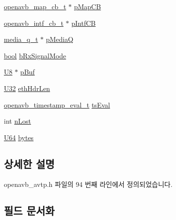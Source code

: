 \begin{DoxyCompactItemize}
\item 
\hyperlink{structopenavb__map__cb__t}{openavb\+\_\+map\+\_\+cb\+\_\+t} $\ast$ \hyperlink{structavtp__stream__t_ae26c54ab64456a99f94f3421e1d01960}{p\+Map\+CB}
\item 
\hyperlink{structopenavb__intf__cb__t}{openavb\+\_\+intf\+\_\+cb\+\_\+t} $\ast$ \hyperlink{structavtp__stream__t_a437f354862480a1e88dbf887decb189a}{p\+Intf\+CB}
\item 
\hyperlink{structmedia__q__t}{media\+\_\+q\+\_\+t} $\ast$ \hyperlink{structavtp__stream__t_a19b6a37a9e1222c5c08444ea175d6a45}{p\+MediaQ}
\item 
\hyperlink{avb__gptp_8h_af6a258d8f3ee5206d682d799316314b1}{bool} \hyperlink{structavtp__stream__t_aa3e26a0875dca06ce8a6040be346c595}{b\+Rx\+Signal\+Mode}
\item 
\hyperlink{openavb__types__base__pub_8h_aa63ef7b996d5487ce35a5a66601f3e73}{U8} $\ast$ \hyperlink{structavtp__stream__t_afedd920ccfd825275dcb5246a3c505d4}{p\+Buf}
\item 
\hyperlink{openavb__types__base__pub_8h_a696390429f2f3b644bde8d0322a24124}{U32} \hyperlink{structavtp__stream__t_accd5eff5dfccb78aa19869522125835b}{eth\+Hdr\+Len}
\item 
\hyperlink{openavb__timestamp_8h_ae4dadfad50e61c1a70e304edb29e6fcc}{openavb\+\_\+timestamp\+\_\+eval\+\_\+t} \hyperlink{structavtp__stream__t_ac4e4017bf67519fe0d817ab545496aad}{ts\+Eval}
\item 
int \hyperlink{structavtp__stream__t_a8d73c0624a1f30a89e2d98013aa91187}{n\+Lost}
\item 
\hyperlink{openavb__types__base__pub_8h_a25809e0734a149248fcf5831efa4e33d}{U64} \hyperlink{structavtp__stream__t_aaef33f7869026b185b6ba7b899c324f4}{bytes}
\end{DoxyCompactItemize}


\subsection{상세한 설명}


openavb\+\_\+avtp.\+h 파일의 94 번째 라인에서 정의되었습니다.



\subsection{필드 문서화}
